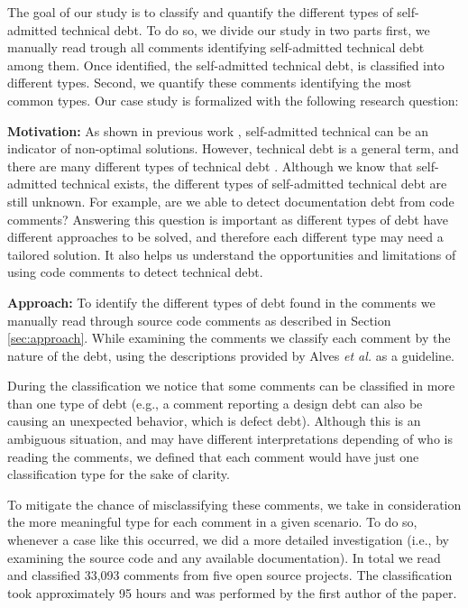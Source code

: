 The goal of our study is to classify and quantify the different types of self-admitted technical debt. To do so, we divide our study in two parts first, we manually read trough all comments identifying self-admitted technical debt among them. Once identified, the self-admitted technical debt, is classified into different types. Second, we quantify these comments identifying the most common types. Our case study is formalized with the following research question:

\vspace{3mm}
\noindent\rqi
\vspace{3mm}

\noindent\textbf{Motivation:} As shown in previous work \cite{Potdar2014ICSME}, self-admitted technical can be an indicator of non-optimal solutions. However, technical debt is a general term, and there are many different types of technical debt \cite{Alves2014MTD}. Although we know that self-admitted technical exists, the different types of self-admitted technical debt are still unknown. For example, are we able to detect documentation debt from code comments? Answering this question is important as different types of debt have different approaches to be solved, and therefore each different type may need a tailored solution. It also helps us understand the opportunities and limitations of using code comments to detect technical debt. 

\vspace{1mm}
\noindent\textbf{Approach:} To identify the different types of debt found in the comments we manually read through source code comments as described in Section \ref{sec:approach}. While examining the comments we classify each comment by the nature of the debt, using the descriptions provided by Alves \textit{et al.} as a guideline. 

During the classification we notice that some comments can be classified in more than one type of debt (e.g., a comment reporting a design debt can also be causing an unexpected behavior, which is defect debt). Although this is an ambiguous situation, and may have different interpretations depending of who is reading the comments, we defined that each comment would have just one classification type for the sake of clarity. 

To mitigate the chance of misclassifying these comments, we take in consideration the more meaningful type for each comment in a given scenario. To do so, whenever a case like this occurred, we did a more detailed investigation (i.e., by examining the source code and any available documentation). In total we read and classified 33,093 comments from five open source projects. The classification took approximately 95 hours and was performed by the first author of the paper. 

